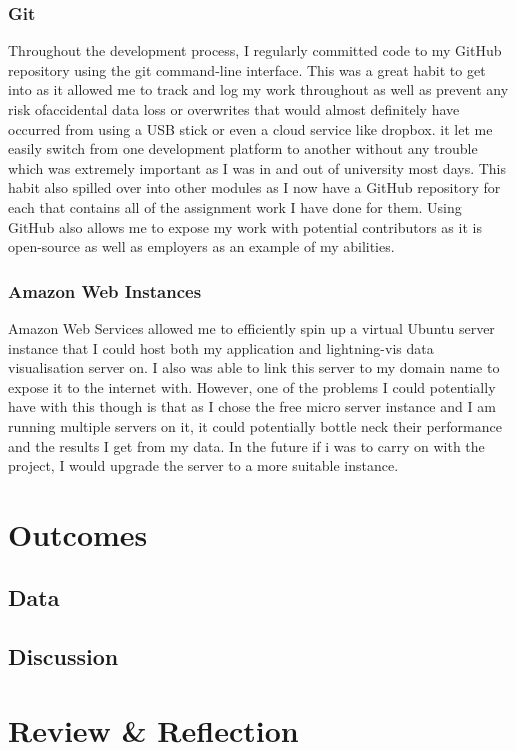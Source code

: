 \documentclass[]{report}
\begin{document}
			\subsection{Git}
			Throughout the development process, I regularly committed code to my GitHub repository using the git command-line interface. This was a great habit to get into as it allowed me to track and log my work throughout as well as prevent any risk ofaccidental data loss or overwrites that would almost definitely have occurred from using a USB stick or even a cloud service like dropbox. it let me easily switch from one development platform to another without any trouble which was extremely important as I was in and out of university most days. This habit also spilled over into other modules as I now have a GitHub repository for each that contains all of the assignment work I have done for them. Using GitHub also allows me to expose my work with potential contributors as it is open-source as well as employers as an example of my abilities. 
			
			\subsection{Amazon Web Instances}
			Amazon Web Services allowed me to efficiently spin up a virtual Ubuntu server instance that I could host both my application and lightning-vis data visualisation server on. I also was able to link this server to my domain name to expose it to the internet with. However, one of the problems I could potentially have with this though is that as I chose the free micro server instance and I am running multiple servers on it, it could potentially bottle neck their performance and the results I get from my data. In the future if i was to carry on with the project, I would upgrade the server to a more suitable instance.
			
	\chapter{Outcomes}
		\section{Data}


		\section{Discussion}
		
	\chapter{Review \& Reflection}	
\end{document}
